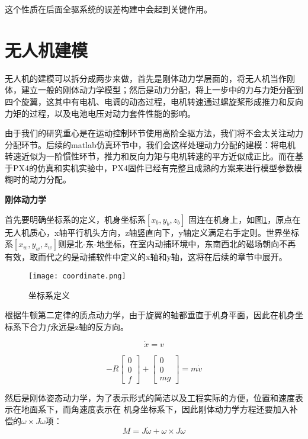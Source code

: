 这个性质在后面全驱系统的误差构建中会起到关键作用。
  \section{无人机建模}
  无人机的建模可以拆分成两步来做，首先是刚体动力学层面的，将无人机当作刚体，建立一般的刚体动力学模型；然后是动力分配，将上一步中的力与力矩分配到四个旋翼，这其中有电机、电调的动态过程，电机转速通过螺旋桨形成推力和反向力矩的过程，以及电池电压对动力套件性能的影响。
  
  由于我们的研究重心是在运动控制环节使用高阶全驱方法，我们将不会太关注动力分配环节。后续的matlab仿真环节中，我们会这样处理动力分配的建模：将电机转速近似为一阶惯性环节，推力和反向力矩与电机转速的平方近似成正比。而在基于PX4的仿真和实机实验中，PX4固件已经有完整且成熟的方案来进行模型参数模糊时的动力分配。


    \textbf{刚体动力学}

    首先要明确坐标系的定义，机身坐标系$[x_b,y_b,z_b]$ 固连在机身上，如图\ref{fig:1}，原点在无人机质心，x轴平行机头方向，z轴竖直向下，y轴定义满足右手定则。世界坐标系$[x_w,y_w,z_w]$则是北-东-地坐标，在室内动捕环境中，东南西北的磁场朝向不再有效，取而代之的是动捕软件中定义的x轴和y轴，这将在后续的章节中展开。

    \begin{figure}[!h]
      \centering
      \texttt{[image: coordinate.png]}
      \caption{坐标系定义}
      \label{fig:1}
    \end{figure}
    根据牛顿第二定律的质点动力学，由于旋翼的轴都垂直于机身平面，因此在机身坐标系下合力$f$永远是z轴的反方向。

  \begin{equation}
    \dot x=v
  \end{equation}

  \begin{equation}
    -R \begin{bmatrix} 0\\ 0\\ f \end{bmatrix}+\begin{bmatrix} 0\\ 0\\ mg\end{bmatrix}=m \dot v 
    \label{equ:a}
  \end{equation}

    然后是刚体姿态动力学，为了表示形式的简洁以及工程实际的方便，位置和速度表示在地面系下，而角速度表示在
    机身坐标系下，因此刚体动力学方程还要加入补偿的$\omega \times J \omega$项：
  \begin{equation}
    M=J \dot\omega +\omega \times J \omega
    \label{equ:M}
  \end{equation}

